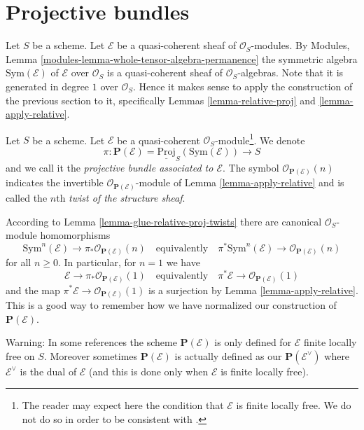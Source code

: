 \section{Projective bundles}
\label{section-projective-bundle}

\noindent
Let $S$ be a scheme.
Let $\mathcal{E}$ be a quasi-coherent sheaf of $\mathcal{O}_S$-modules.
By Modules, Lemma \ref{modules-lemma-whole-tensor-algebra-permanence}
the symmetric algebra $\text{Sym}(\mathcal{E})$ of
$\mathcal{E}$ over $\mathcal{O}_S$
is a quasi-coherent sheaf of $\mathcal{O}_S$-algebras.
Note that it is generated in degree $1$ over $\mathcal{O}_S$.
Hence it makes sense to apply the construction of the
previous section to it, specifically Lemmas
\ref{lemma-relative-proj} and \ref{lemma-apply-relative}.

\begin{definition}
\label{definition-projective-bundle}
Let $S$ be a scheme. Let $\mathcal{E}$ be a quasi-coherent
$\mathcal{O}_S$-module\footnote{The reader may expect here
the condition that $\mathcal{E}$ is finite locally free. We do not
do so in order to be consistent with
\cite[II, Definition 4.1.1]{EGA}.}.
We denote
$$
\pi :
\mathbf{P}(\mathcal{E}) = \underline{\text{Proj}}_S(\text{Sym}(\mathcal{E}))
\longrightarrow
S
$$
and we call it the {\it projective bundle associated to $\mathcal{E}$}.
The symbol $\mathcal{O}_{\mathbf{P}(\mathcal{E})}(n)$
indicates the invertible $\mathcal{O}_{\mathbf{P}(\mathcal{E})}$-module
of Lemma \ref{lemma-apply-relative} and is called the $n$th
{\it twist of the structure sheaf}.
\end{definition}

\noindent
According to Lemma \ref{lemma-glue-relative-proj-twists} there are
canonical $\mathcal{O}_S$-module homomorphisms
$$
\text{Sym}^n(\mathcal{E})
\longrightarrow
\pi_*\mathcal{O}_{\mathbf{P}(\mathcal{E})}(n)
\quad\text{equivalently}\quad
\pi^*\text{Sym}^n(\mathcal{E})
\longrightarrow
\mathcal{O}_{\mathbf{P}(\mathcal{E})}(n)
$$
for all $n \geq 0$. In particular, for $n = 1$ we have
$$
\mathcal{E}
\longrightarrow
\pi_*\mathcal{O}_{\mathbf{P}(\mathcal{E})}(1)
\quad\text{equivalently}\quad
\pi^*\mathcal{E}
\longrightarrow
\mathcal{O}_{\mathbf{P}(\mathcal{E})}(1)
$$
and the map $\pi^*\mathcal{E} \to \mathcal{O}_{\mathbf{P}(\mathcal{E})}(1)$
is a surjection by Lemma \ref{lemma-apply-relative}.
This is a good way to remember how we have normalized
our construction of $\mathbf{P}(\mathcal{E})$.

\medskip\noindent
Warning: In some references the scheme $\mathbf{P}(\mathcal{E})$
is only defined for $\mathcal{E}$ finite locally free on $S$.
Moreover sometimes $\mathbf{P}(\mathcal{E})$ is actually defined as our
$\mathbf{P}(\mathcal{E}^\vee)$ where $\mathcal{E}^\vee$
is the dual of $\mathcal{E}$ (and this is done only when $\mathcal{E}$ is
finite locally free).


